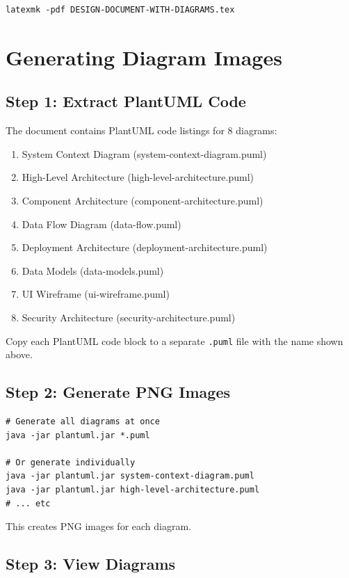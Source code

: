\documentclass[12pt,a4paper]{report}
\begin{document}
\begin{lstlisting}[style=bashStyle]
latexmk -pdf DESIGN-DOCUMENT-WITH-DIAGRAMS.tex
\end{lstlisting}

\section{Generating Diagram Images}

\subsection{Step 1: Extract PlantUML Code}

The document contains PlantUML code listings for 8 diagrams:

\begin{enumerate}
    \item System Context Diagram (system-context-diagram.puml)
    \item High-Level Architecture (high-level-architecture.puml)
    \item Component Architecture (component-architecture.puml)
    \item Data Flow Diagram (data-flow.puml)
    \item Deployment Architecture (deployment-architecture.puml)
    \item Data Models (data-models.puml)
    \item UI Wireframe (ui-wireframe.puml)
    \item Security Architecture (security-architecture.puml)
\end{enumerate}

Copy each PlantUML code block to a separate \texttt{.puml} file with the name shown above.

\subsection{Step 2: Generate PNG Images}

\begin{lstlisting}[style=bashStyle]
# Generate all diagrams at once
java -jar plantuml.jar *.puml

# Or generate individually
java -jar plantuml.jar system-context-diagram.puml
java -jar plantuml.jar high-level-architecture.puml
# ... etc
\end{lstlisting}

This creates PNG images for each diagram.

\subsection{Step 3: View Diagrams}
\end{document}
